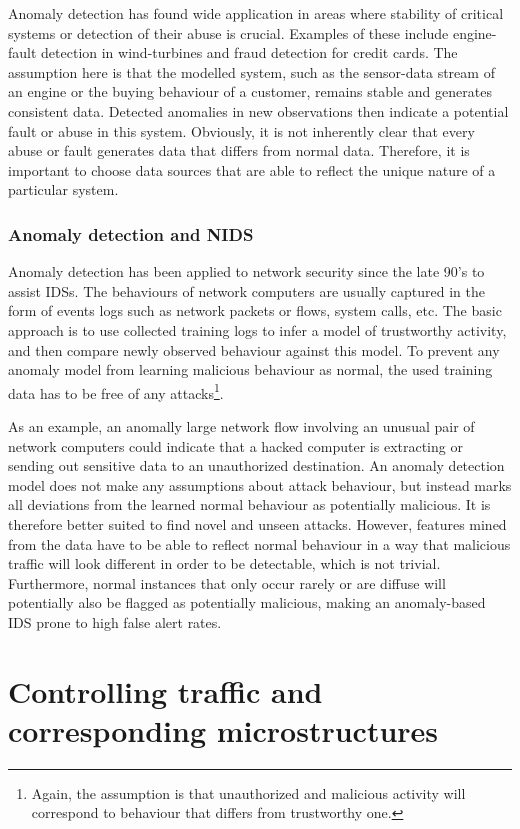 \documentclass[a4paper,12pt,twoside]{article}
\begin{document}
Anomaly detection has found wide application in areas where stability of  critical systems or detection of their abuse is crucial. Examples of these include engine-fault detection in wind-turbines and fraud detection for credit cards. The assumption here is that the modelled system, such as the sensor-data stream of an engine or the buying behaviour of a customer, remains stable and generates consistent data. Detected anomalies in new observations then indicate a potential fault or abuse in this system. Obviously, it is not inherently clear that every abuse or fault generates data that differs from normal data. Therefore, it is important to choose data sources that are able to reflect the unique nature of a particular system.

\subsubsection{Anomaly detection and NIDS}

Anomaly detection has been applied to network security since the late 90's to assist IDSs. The behaviours of network computers are usually captured in the form of events logs such as network packets or flows, system calls, etc. The basic approach is to use collected training logs to infer a model of trustworthy activity, and then compare newly observed behaviour against this model.  To prevent any anomaly model from learning malicious behaviour as normal, the used training data has to be free of any attacks\footnote{Again, the assumption is that unauthorized and malicious activity will correspond to behaviour that differs from trustworthy one.}. 

As an example, an anomally large network flow involving an unusual pair of network computers could indicate that a hacked computer is extracting or sending out sensitive data to an unauthorized destination. An anomaly detection model does not make any assumptions about attack behaviour, but instead marks all deviations from the learned normal behaviour as potentially malicious. It is therefore better suited to find novel and unseen attacks. However, features mined from the data have to be able to reflect normal behaviour in a way that malicious traffic will look different in order to be detectable, which is not trivial. Furthermore, normal instances that only occur rarely or are diffuse will potentially also be flagged as potentially malicious, making an anomaly-based IDS prone to high false alert rates.


\section{Controlling traffic and corresponding microstructures}
\end{document}
